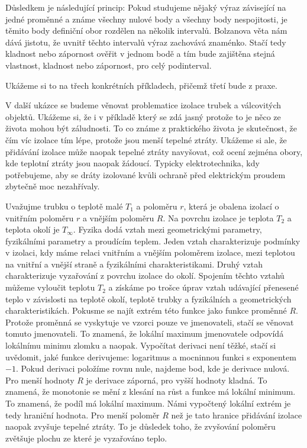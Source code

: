\documentclass[12pt]{article}
\begin{document}
Důsledkem je následující princip: Pokud studujeme nějaký výraz závisející na jedné proměnné a známe všechny nulové body a všechny body nespojitosti, je těmito body definiční obor rozdělen na několik intervalů. Bolzanova věta nám dává jistotu, že uvnitř těchto intervalů výraz zachovává znaménko. Stačí tedy kladnost nebo zápornost ověřit v jednom bodě a tím bude zajištěna stejná vlastnost, kladnost nebo zápornost, pro celý podinterval. 

Ukážeme si to na třech konkrétních příkladech, přičemž třetí bude z praxe.

V další ukázce se budeme věnovat problematice izolace trubek a válcovitých objektů. Ukážeme si, že i v příkladě který se zdá jasný protože to je něco ze života mohou být záludnosti. To co známe z praktického života je skutečnost, že čím víc izolace tím lépe, protože jsou menší tepelné ztráty. Ukážeme si ale, že přidávání izolace může naopak tepelné ztráty navyšovat, což ocení zejména obory, kde teplotní ztráty jsou naopak žádoucí. Typicky elektrotechnika, kdy potřebujeme, aby se dráty izolované kvůli ochraně před elektrickým proudem zbytečně moc nezahřívaly.

Uvažujme trubku o teplotě malé $T_1$ a poloměru $r$, která je obalena izolací o vnitřním poloměru $r$ a vnějším poloměru $R$. Na povrchu izolace je teplota $T_2$ a teplota okolí je $T_\infty$. Fyzika dodá vztah mezi geometrickými parametry, fyzikálními parametry a proudícím teplem. Jeden vztah charakterizuje podmínky v izolaci, kdy máme relaci vnitřním a vnějším poloměrem izolace, mezi teplotou na vnitřní a vnější straně a fyzikálními charakteristikami. Druhý vztah charakterizuje vyzařování z povrchu izolace do okolí. Spojením těchto vztahů můžeme vyloučit teplotu $T_2$ a získáme po trošce úprav vztah udávající přenesené teplo v závislosti na teplotě okolí, teplotě trubky a fyzikálních a geometrických charakteristikách.
Pokusme se najít extrém této funkce jako funkce proměnné $R$. Protože proměnná se vyskytuje ve vzorci pouze ve jmenovateli, stačí se věnovat tomuto jmenovateli. To znamená, že lokální maximum jmenovatele odpovídá lokálnímu minimu zlomku a naopak. Vypočítat derivaci není těžké, stačí si uvědomit, jaké funkce derivujeme: logaritmus a mocninnou funkci s exponentem $-1$. Pokud derivaci položíme rovnu nule, najdeme bod, kde je derivace nulová. Pro menší hodnoty $R$ je derivace záporná, pro vyšší hodnoty kladná. To znamená, že monotonie se mění z klesání na růst a funkce má lokální minimum. To znamená, že podíl má lokální maximum. Námi vypočtený lokální extrém je tedy hraniční hodnota. Pro menší poloměr $R$ než je tato hranice přidávání izolace naopak zvyšuje tepelné ztráty. To je důsledek toho, že zvyšování poloměru zvětšuje plochu ze které je vyzařováno teplo.
\end{document}
